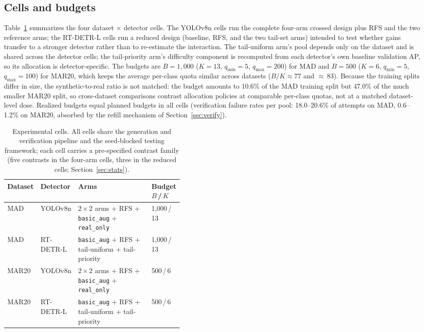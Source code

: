 \documentclass[preprint,12pt,authoryear]{elsarticle}
\begin{document}
\subsection{Cells and budgets}
Table~\ref{tab:cells} summarizes the four dataset $\times$ detector
cells. The YOLOv8n cells run the complete four-arm crossed design plus RFS
and the two reference arms; the RT-DETR-L cells run a reduced design (baseline, RFS, and
the two tail-set arms) intended to test whether gains transfer to a
stronger detector rather than to re-estimate the interaction. The tail-uniform arm's pool depends only on the dataset and is shared
across the detector cells; the tail-priority arm's difficulty
component is recomputed
from each detector's own baseline validation AP, so its allocation is
detector-specific. The budgets are $B = 1{,}000$ ($K = 13$, $q_{\min} = 5$, $q_{\max} = 200$) for MAD and $B = 500$
($K = 6$, $q_{\min} = 5$, $q_{\max} = 100$) for MAR20,
which keeps the average per-class quota similar across datasets
($B/K \approx 77$ and ${\approx}\,83$). Because the training splits
differ in size, the synthetic-to-real ratio is not matched: the budget
amounts to 10.6\% of the MAD training split but 47.0\% of the much
smaller MAR20 split, so cross-dataset comparisons contrast allocation
policies at comparable per-class quotas, not at a matched
dataset-level dose. Realized budgets equal planned budgets in all
cells (verification failure rates per pool: 18.0--20.6\% of attempts
on MAD, 0.6--1.2\% on MAR20, absorbed by the refill mechanism of
Section~\ref{sec:verify}).

\begin{table}[t]
\centering
\caption{Experimental cells. All cells share the generation and
verification pipeline and the seed-blocked testing framework; each
cell carries a pre-specified contrast family (five contrasts in the
four-arm cells, three in the reduced cells; Section~\ref{sec:stats}).}
\label{tab:cells}
\small
\begin{tabular}{llp{0.42\linewidth}l}
\toprule
Dataset & Detector & Arms & Budget $B$\,/\,$K$ \\
\midrule
MAD   & YOLOv8n   & $2\times2$ arms + RFS + \texttt{basic\_aug} + \texttt{real\_only} & 1{,}000\,/\,13 \\
MAD   & RT-DETR-L & \texttt{basic\_aug} + RFS + tail-uniform + tail-priority & 1{,}000\,/\,13 \\
MAR20 & YOLOv8n   & $2\times2$ arms + RFS + \texttt{basic\_aug} + \texttt{real\_only} & 500\,/\,6 \\
MAR20 & RT-DETR-L & \texttt{basic\_aug} + RFS + tail-uniform + tail-priority & 500\,/\,6 \\
\bottomrule
\end{tabular}
\end{table}
\end{document}
